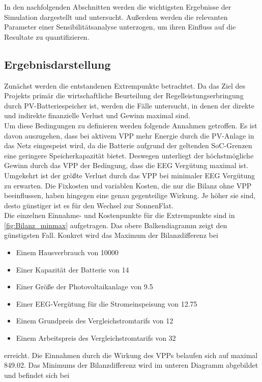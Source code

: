 In den nachfolgenden Abschnitten werden die wichtigsten Ergebnisse der Simulation dargestellt und untersucht. Außerdem werden die relevanten Parameter einer Sensibilitätsanalyse unterzogen, um ihren Einfluss auf die Resultate zu quantifizieren.\medskip

\subsection{Ergebnisdarstellung}
Zunächst werden die entstandenen Extrempunkte betrachtet. Da das Ziel des Projekts primär die wirtschaftliche Beurteilung der Regelleistungserbringung durch PV-Batteriespeicher ist, werden die Fälle untersucht, in denen der direkte und indirekte finanzielle Verlust und Gewinn maximal sind. \\
Um diese Bedingungen zu definieren werden folgende Annahmen getroffen. Es ist davon auszugehen, dass bei aktivem VPP mehr Energie durch die PV-Anlage in das Netz eingespeist wird, da die Batterie aufgrund der geltenden SoC-Grenzen eine geringere Speicherkapazität bietet. Deswegen unterliegt der höchstmögliche Gewinn durch das VPP der Bedingung, dass die EEG Vergütung maximal ist. Umgekehrt ist der größte Verlust durch das VPP bei minimaler EEG Vergütung zu erwarten. Die Fixkosten und variablen Kosten, die nur die Bilanz ohne VPP beeinflussen, haben hingegen eine genau gegenteilige Wirkung. Je höher sie sind, desto günstiger ist es für den Wechsel zur SonnenFlat. \\
Die einzelnen Einnahme- und Kostenpunkte für die Extrempunkte sind in \ref{fig:Bilanz_minmax} aufgetragen. Das obere Balkendiagramm zeigt den günstigsten Fall. Konkret wird das Maximum der Bilanzdifferenz bei 

\begin{itemize}
\itemsep-0.5em
	\item Einem Hausverbrauch von \SI{10000}{\kwh}
	\item Einer Kapazität der Batterie von \SI{14}{\kwh}
	\item Einer Größe der Photovoltaikanlage von \SI{9.5}{\kwp}
	\item Einer EEG-Vergütung für die Stromeinspeisung von \SI{12.75}{\ctkwh}
	\item Einem Grundpreis des Vergleichstromtarifs von \SI{12}{\Eurkwh}
	\item Einem Arbeitspreis des Vergleichstromtarifs von \SI{32}{\ctkwh}
\end{itemize}

erreicht. Die Einnahmen durch die Wirkung des VPPs belaufen sich auf maximal \SI{849.02}{\sieuro}.
Das Minimums der Bilanzdifferenz wird im unteren Diagramm abgebildet und befindet sich bei

